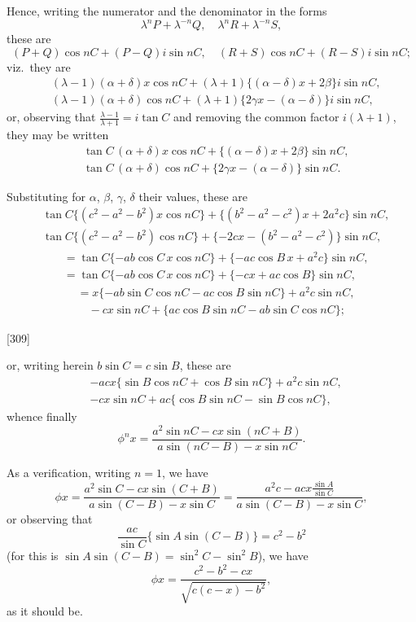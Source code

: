\documentclass[11pt,a4paper]{book}
\begin{document}
Hence, writing the numerator and the denominator in the forms
\[
\lambda^n P + \lambda^{-n}Q,\quad \lambda^n R + \lambda^{-n}S,
\]
these are
\[
(P + Q)\cos nC + (P - Q)i\sin nC,\quad (R + S)\cos nC + (R - S)i\sin nC;
\]
viz.\ they are
\begin{align*}
&(\lambda - 1)(\alpha + \delta)x\cos nC + (\lambda + 1)\{(\alpha - \delta)x + 2\beta\}i\sin nC,\\
&(\lambda - 1)(\alpha + \delta)\cos nC + (\lambda + 1)\{2\gamma x - (\alpha - \delta)\}i\sin nC,
\end{align*}
or, observing that $\frac{\lambda - 1}{\lambda + 1} = i\tan C$ and removing the common factor $i(\lambda + 1)$, they may be written
\begin{align*}
&\tan C\,(\alpha + \delta)x\cos nC + \{ (\alpha - \delta)x + 2\beta \}\sin nC,\\
&\tan C\,(\alpha + \delta)\cos nC + \{ 2\gamma x - (\alpha - \delta) \}\sin nC.
\end{align*}

Substituting for $\alpha$, $\beta$, $\gamma$, $\delta$ their values, these are
\begin{align*}
&\tan C\{(c^2 - a^2 - b^2)x\cos nC\} + \{(b^2 - a^2 - c^2)x + 2a^2c\}\sin nC,\\
&\tan C\{(c^2 - a^2 - b^2)\cos nC\} + \{-2cx - (b^2 - a^2 - c^2)\}\sin nC,
\end{align*}
\begin{align*}
&= \tan C\{-ab\cos C\,x\cos nC\} + \{-ac\cos B\,x + a^2c\}\sin nC,\\
&= \tan C\{-ab\cos C\,x\cos nC\} + \{-cx + ac\cos B\}\sin nC,
\end{align*}
\begin{align*}
&= x\{-ab\sin C\cos nC - ac\cos B\sin nC\} + a^2c\sin nC,\\
&\quad -cx\sin nC + \{ac\cos B\sin nC - ab\sin C\cos nC\};
\end{align*}

[309]

or, writing herein $b\sin C = c\sin B$, these are
\begin{align*}
&-acx\{\sin B\cos nC + \cos B\sin nC\} + a^2c\sin nC,\\
&-cx\sin nC + ac\{\cos B\sin nC - \sin B\cos nC\},
\end{align*}
whence finally
\[
\phi^n x = \frac{a^2\sin nC - cx\sin(nC + B)}{a\sin(nC - B) - x\sin nC}.
\]

As a verification, writing $n = 1$, we have
\[
\phi x = \frac{a^2\sin C - cx\sin(C + B)}{a\sin(C - B) - x\sin C}
= \frac{a^2c - acx\frac{\sin A}{\sin C}}{a\sin(C - B) - x\sin C},
\]
or observing that
\[
\frac{ac}{\sin C}\{\sin A\sin(C - B)\} = c^2 - b^2
\]
(for this is $\sin A\sin(C - B) = \sin^2 C - \sin^2 B$), we have
\[
\phi x = \frac{c^2 - b^2 - cx}{\sqrt{c(c - x) - b^2}},
\]
as it should be.
\end{document}
